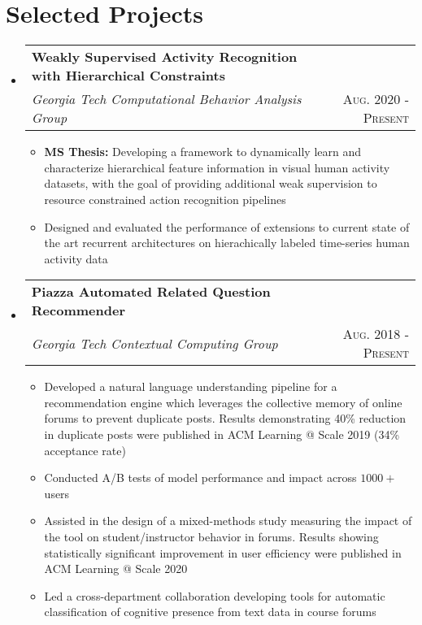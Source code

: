 \documentclass[letterpaper,11pt]{article}
\makeatletter
\newcommand{\resumePlainItem}[1]{
  \item\small{#1 \vspace{-2pt}}
}
\newcommand{\resumeSubheading}[4]{
  \vspace{-1pt}\item[]
    \begin{tabular*}{0.97\textwidth}{l@{\extracolsep{\fill}}r}
      \textbf{#1} & #2 \\
      \textit{\small#3} & \textsc{\small #4} \\ %
    \end{tabular*}\vspace{-5pt}
}
\newcommand{\resumeSubHeadingListStart}{\begin{itemize}[leftmargin=*]}
\newcommand{\resumeSubHeadingListEnd}{\end{itemize}}
\newcommand{\resumeItemListStart}{\begin{itemize}}
\newcommand{\resumeItemListEnd}{\end{itemize}\vspace{-5pt}}
\newenvironment{resumeItemList}{\resumeItemListStart}{\resumeItemListEnd}
\newenvironment{resumeSubheadingList}{\resumeSubHeadingListStart}{\resumeSubHeadingListEnd}
\makeatother
\begin{document}
\section{Selected Projects}
  \begin{resumeSubheadingList}
    \resumeSubheading{Weakly Supervised Activity Recognition with Hierarchical Constraints}{}
    {Georgia Tech Computational Behavior Analysis Group}{Aug. 2020 - Present}
    \begin{resumeItemList}
      \resumePlainItem{\textbf{MS Thesis:} Developing a framework to dynamically learn and characterize
      hierarchical feature information in visual human activity datasets,
      with the goal of providing additional weak supervision to resource constrained
      action recognition pipelines}
      \resumePlainItem{Designed and evaluated the performance of extensions to current state of the art recurrent architectures
      on hierachically labeled time-series human activity data}
    \end{resumeItemList}
    \resumeSubheading
    {Piazza Automated Related Question Recommender}{} %
    {Georgia Tech Contextual Computing Group}{Aug. 2018 - Present}
    \begin{resumeItemList}
      \resumePlainItem{Developed a natural language understanding pipeline
      for a recommendation engine which leverages the collective memory of
      online forums to prevent duplicate posts. Results demonstrating 40\% reduction in
      duplicate posts were published in ACM Learning @ Scale 2019 (34\% acceptance rate)}
      \resumePlainItem{Conducted A/B tests of model performance and impact across $1000+$ users}
      \resumePlainItem{Assisted in the design of a mixed-methods study measuring the impact of
      the tool on student/instructor behavior in forums. Results showing statistically significant
      improvement in user efficiency were published in ACM Learning @ Scale 2020}
      \resumePlainItem{Led a cross-department collaboration developing tools for automatic classification
      of cognitive presence from text data in course forums}
    \end{resumeItemList}


\end{resumeSubheadingList}
\end{document}
